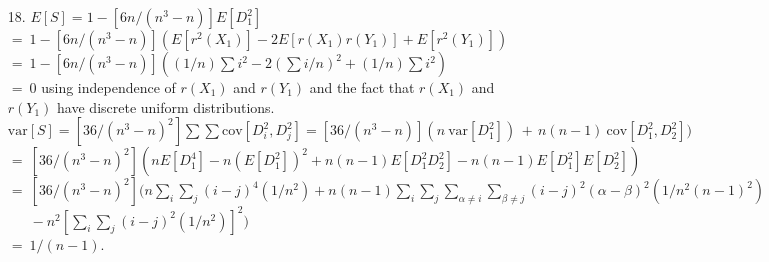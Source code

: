 \begin{enumerate}
	\item[18.] $E[S] = 1 - [6n/(n^3-n)]E[D_1^2]$ \\
	$=\ 1 - [6n/(n^3-n)](E[r^2(X_1)] - 2E[r(X_1)r(Y_1)] + E[r^2(Y_1)])$ \\
	$=\ 1 - [6n/(n^3-n)]((1/n)\sum i^2 - 2(\sum i/n)^2 + (1/n)\sum i^2)$ \\
	$=\ 0$ using independence of $r(X_1)$ and $r(Y_1)$ and the fact that  $r(X_1)$ and \\ 
	\phantom{$=\ 0$}$r(Y_1)$ have discrete uniform distributions. \\
	$\mbox{var}[S] = [36/(n^3-n)^2]\sum\sum \mbox{cov}[D_i^2,D_j^2] = [36/(n^3-n)](n\ \mbox{var}[D_1^2]) \,+\, n(n-1)\ \mbox{cov}[D_1^2,D_2^2])$ \\
	$=\ [36/(n^3-n)^2](nE[D_1^4] -n(E[D_1^2])^2 +n(n-1)E[D_1^2D_2^2] -n(n-1)E[D_1^2]E[D_2^2])$ \\
	$=\ [36/(n^3-n)^2](n\sum\limits_{i}\sum\limits_{j}(i-j)^4(1/n^2) + n(n-1)\sum\limits_{i}\sum\limits_{j}\sum\limits_{\alpha\ne i}\sum\limits_{\beta\ne j}(i-j)^2(\alpha-\beta)^2(1/n^2(n-1)^2)$ \\
	$\phantom{=\ } - n^2[\sum\limits_{i}\sum\limits_{j}(i-j)^2(1/n^2)]^2)$ \\
	$=\ 1/(n-1)$. 
	
\end{enumerate}